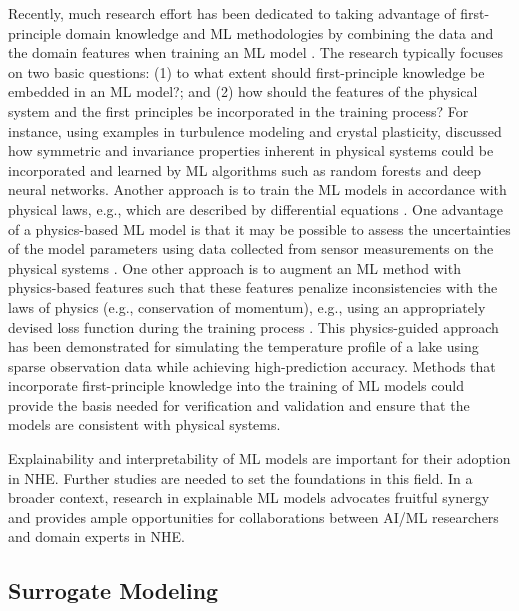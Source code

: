 Recently, much research effort has been dedicated to taking advantage of first-principle domain knowledge and ML methodologies by combining the data and the domain features when training an ML model \citep{willard2020integrating}. The research typically focuses on two basic questions: (1) to what extent should first-principle knowledge be embedded in an ML model?; and (2) how should the features of the physical system and the first principles be incorporated in the training process? For instance, using examples in turbulence modeling and crystal plasticity, \citet{ling2016machine} discussed how symmetric and invariance properties inherent in physical systems could be incorporated and learned by ML algorithms such as random forests and deep neural networks. Another approach is to train the ML models in accordance with physical laws, e.g.,  which are described by differential equations \citep{raissi2019physicsinformed}. One advantage of a physics-based ML model is that it may be possible to assess the uncertainties of the model parameters  using data collected from sensor measurements on the physical systems \citep{zhang2019quantifying}. One other approach is to augment an ML method with physics-based features such that these features penalize inconsistencies with the laws of physics (e.g., conservation of momentum), e.g., using an appropriately devised loss function during the training process \citep{jia2020physicsguided}. This physics-guided approach has been demonstrated for simulating the temperature profile of a lake using sparse observation data while achieving high-prediction accuracy. Methods that incorporate first-principle knowledge into the training of ML models could provide the basis needed for verification and validation and ensure that the models are consistent with physical systems. 

Explainability and interpretability of ML models are important for their adoption in NHE. Further studies are needed to set the foundations in this field. In a broader context, research in explainable ML models advocates fruitful synergy and provides ample opportunities for collaborations between AI/ML researchers and domain experts in NHE.

\subsection{Surrogate Modeling}

